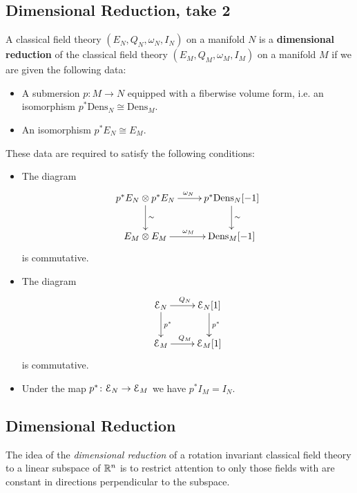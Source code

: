 \documentclass[10pt, oneside]{article}
\newcommand{\Dens}{\mathrm{Dens}}
\begin{document}
\subsection{Dimensional Reduction, take 2}

\begin{definition}
A classical field theory $(E_N, Q_N, \omega_N, I_N)$ on a manifold $N$ is a {\bf dimensional reduction} of the classical field theory $(E_M, Q_M, \omega_M, I_M)$ on a manifold $M$ if we are given the following data:
\begin{itemize}
\item A submersion $p\colon M\rightarrow N$ equipped with a fiberwise volume form, i.e. an isomorphism $p^*\Dens_N\cong \Dens_M$.

\item An isomorphism $p^* E_N\cong E_M$.
\end{itemize}
These data are required to satisfy the following conditions:
\begin{itemize}
\item The diagram
\[
\xymatrix{
p^* E_N\otimes p^* E_N \ar^{\omega_N}[r] \ar^{\sim}[d] & p^*\Dens_N[-1] \ar^{\sim}[d] \\
E_M\otimes E_M \ar^{\omega_M}[r] & \Dens_M[-1]
}
\]
is commutative.

\item The diagram
\[
\xymatrix{
\cE_N \ar^{Q_N}[r] \ar^{p^*}[d] & \cE_N[1] \ar^{p^*}[d] \\
\cE_M \ar^{Q_M}[r] & \cE_M[1]
}
\]
is commutative.

\item Under the map $p^*\colon \mathcal E_N\rightarrow \mathcal E_M$ we have $p^* I_M = I_N$.
\end{itemize}
\end{definition}


\subsection{Dimensional Reduction} \label{dim_red_section}
The idea of the \emph{dimensional reduction} of a rotation invariant classical field theory to a linear subspace of $\mathbb R^n$ is to restrict attention to only those fields with are constant in directions perpendicular to the subspace. 
\end{document}
